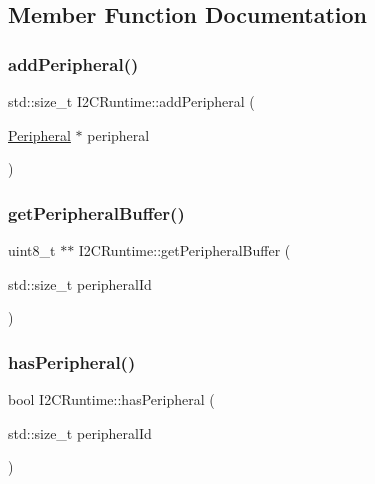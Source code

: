 \subsection{Member Function Documentation}
\mbox{\label{class_i2_c_runtime_aba281d78dfd704b614f0e126e9f846e5}} 
\subsubsection{\texorpdfstring{add\+Peripheral()}{addPeripheral()}}
{\footnotesize\ttfamily std\+::size\+\_\+t I2\+C\+Runtime\+::add\+Peripheral (\begin{DoxyParamCaption}\item[{\mbox{\hyperlink{struct_peripheral}{Peripheral}} $\ast$}]{peripheral }\end{DoxyParamCaption})}

\mbox{\label{class_i2_c_runtime_a68052a5397fdb5a1cd408d2e6ff0bac2}} 
\subsubsection{\texorpdfstring{get\+Peripheral\+Buffer()}{getPeripheralBuffer()}}
{\footnotesize\ttfamily uint8\+\_\+t $\ast$$\ast$ I2\+C\+Runtime\+::get\+Peripheral\+Buffer (\begin{DoxyParamCaption}\item[{std\+::size\+\_\+t}]{peripheral\+Id }\end{DoxyParamCaption})}

\mbox{\label{class_i2_c_runtime_a945f727b6d885e2c191d547b9f66f679}} 
\subsubsection{\texorpdfstring{has\+Peripheral()}{hasPeripheral()}}
{\footnotesize\ttfamily bool I2\+C\+Runtime\+::has\+Peripheral (\begin{DoxyParamCaption}\item[{std\+::size\+\_\+t}]{peripheral\+Id }\end{DoxyParamCaption})}

